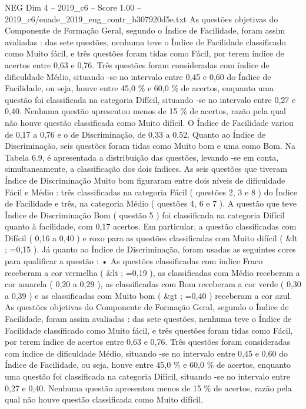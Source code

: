 \begin{textsample}{NEG Dim 4 – 2019\_c6 – Score 1.00 – 2019\_c6/enade\_2019\_eng\_contr\_b307920d5e.txt}
As questões objetivas do Componente de Formação Geral, segundo o Índice de Facilidade, foram assim avaliadas : das sete questões, nenhuma teve o Índice de Facilidade classificado como Muito fácil, e três questões foram tidas como Fácil, por terem índice de acertos entre 0,63 e 0,76.
Três questões foram consideradas com índice de dificuldade Médio, situando -se no intervalo entre 0,45 e 0,60 do Índice de Facilidade, ou seja, houve entre 45,0 \% e 60,0 \% de acertos, enquanto uma questão foi classificada na categoria Difícil, situando -se no intervalo entre 0,27 e 0,40.
Nenhuma questão apresentou menos de 15 \% de acertos, razão pela qual não houve questão classificada como Muito difícil.
O Índice de Facilidade variou de 0,17 a 0,76 e o de Discriminação, de 0,33 a 0,52.
Quanto ao Índice de Discriminação, seis questões foram tidas como Muito bom e uma como Bom.
Na Tabela 6.9, é apresentada a distribuição das questões, levando -se em conta, simultaneamente, a classificação dos dois índices.
As seis questões que tiveram Índice de Discriminação Muito bom figuraram entre dois níveis de dificuldade Fácil e Médio : três classificadas na categoria Fácil ( questões 2, 3 e 8 ) do Índice de Facilidade e três, na categoria Médio ( questões 4, 6 e 7 ).
A questão que teve Índice de Discriminação Bom ( questão 5 ) foi classificada na categoria Difícil quanto à facilidade, com 0,17 acertos.
Em particular, a questão classificadas com Difícil ( 0,16 a 0,40 ) e roxo para as questões classificadas com Muito difícil ( \&lt ; =0,15 ).
Já quanto ao Índice de Discriminação, foram usadas as seguintes cores para qualificar a questão : • As questões classificadas com índice Fraco receberam a cor vermelha ( \&lt ; =0,19 ), as classificadas com Médio receberam a cor amarela ( 0,20 a 0,29 ), as classificadas com Bom receberam a cor verde ( 0,30 a 0,39 ) e as classificadas com Muito bom ( \&gt ; =0,40 ) receberam a cor azul.
As questões objetivas do Componente de Formação Geral, segundo o Índice de Facilidade, foram assim avaliadas : das sete questões, nenhuma teve o Índice de Facilidade classificado como Muito fácil, e três questões foram tidas como Fácil, por terem índice de acertos entre 0,63 e 0,76.
Três questões foram consideradas com índice de dificuldade Médio, situando -se no intervalo entre 0,45 e 0,60 do Índice de Facilidade, ou seja, houve entre 45,0 \% e 60,0 \% de acertos, enquanto uma questão foi classificada na categoria Difícil, situando -se no intervalo entre 0,27 e 0,40.
Nenhuma questão apresentou menos de 15 \% de acertos, razão pela qual não houve questão classificada como Muito difícil.

\end{textsample}
